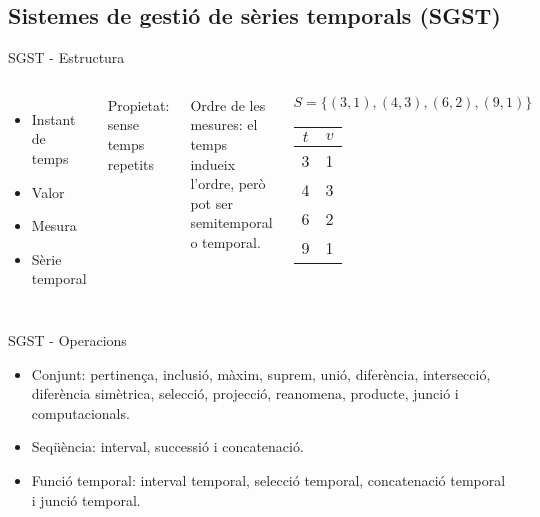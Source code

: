 \subsection[SGST]{Sistemes de gestió de sèries temporals (SGST)}




\begin{frame}{SGST - Estructura}
\begin{columns}

  \column{5cm}
  \begin{itemize}

  \item Instant de temps
  \item Valor
  \item Mesura
  \item Sèrie temporal

  \end{itemize}

  Propietat: sense temps repetits

  Ordre de les mesures: el temps indueix l'ordre, però pot ser
  semitemporal o temporal.
  

  \column{5cm}
  \begin{center}
    $S=\{(3,1), (4,3), (6,2), (9,1)\}$\\[1em]

    \begin{tabular}[h]{|c|c|}\hline
      $t$ & $v$ \\\hline
      3 & 1 \\
      4 & 3 \\
      6 & 2 \\
      9 & 1 \\\hline
    \end{tabular}

  \end{center}

\end{columns}
\end{frame}




\begin{frame}{SGST - Operacions}


  \begin{itemize}
    
  \item Conjunt: pertinença, inclusió, màxim, suprem, unió,
    diferència, intersecció, diferència simètrica, selecció,
    projecció, reanomena, producte, junció i computacionals.
  \item Seqüència: interval, successió i concatenació.
  \item Funció temporal: interval temporal, selecció temporal,
    concatenació temporal i junció temporal.

  \end{itemize}


\end{frame}



